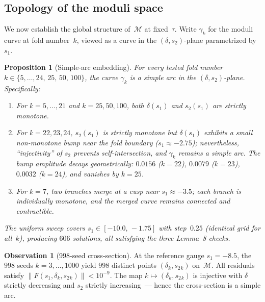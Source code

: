 \documentclass[11pt,a4paper]{article}
\theoremstyle{plain}
\newtheorem{proposition}[theorem]{Proposition}
\theoremstyle{definition}
\newtheorem{observation}[theorem]{Observation}
\theoremstyle{remark}
\newcommand{\norm}[1]{\lVert #1 \rVert}
\begin{document}
\subsection{Topology of the moduli space}%
\label{sec:moduli-topology}

We now establish the global structure of~$\mathcal{M}$ at fixed~$\tau$.
Write $\gamma_k$ for the moduli curve at fold number~$k$, viewed as
a curve in the $(\delta,s_2)$-plane parametrized by~$s_1$.

\begin{proposition}[Simple-arc embedding]
\label{prop:simple-arc}
For every tested fold number $k \in \{5,\ldots,24,\, 25,\, 50,\, 100\}$,
the curve $\gamma_k$ is a simple arc in the
$(\delta,s_2)$-plane.  Specifically:
\begin{enumerate}[label=\upshape(\roman*)]
\item For $k = 5,\ldots,21$ and $k = 25,50,100$, both
  $\delta(s_1)$ and $s_2(s_1)$ are strictly monotone.
\item For $k = 22,23,24$, $s_2(s_1)$ is strictly monotone
  but $\delta(s_1)$ exhibits a small non-monotone bump
  near the fold boundary ($s_1 \approx -2.75$);
  nevertheless, ``injectivity'' of $s_2$ prevents
  self-intersection, and $\gamma_k$ remains a simple arc.
  The bump amplitude decays geometrically:
  $0.0156$ ($k=22$), $0.0079$ ($k=23$),
  $0.0032$ ($k=24$), and vanishes by $k = 25$.
\item For $k = 7$, two branches merge at a cusp near
  $s_1 \approx -3.5$; each branch is individually
  monotone, and the merged curve remains connected and
  contractible.
\end{enumerate}
The uniform sweep covers $s_1 \in [-10.0,\, -1.75]$ with
step~$0.25$ (identical grid for all~$k$), producing
$606$ solutions, \emph{all} satisfying the three Lemma~8
checks.
\end{proposition}

\begin{observation}[998-seed cross-section]
\label{obs:cross-section}
At the reference gauge $s_1 = -8.5$, the $998$ seeds
$k = 3,\ldots,1000$ yield $998$ distinct points
$(\delta_k, s_2{}_k)$ on~$\mathcal{M}$.  All residuals
satisfy $\norm{F(s_1, \delta_k, s_2{}_k)} < 10^{-9}$.
The map $k \mapsto (\delta_k, s_2{}_k)$ is injective with
$\delta$ strictly decreasing and $s_2$ strictly increasing~---
hence the cross-section is a simple arc.
\end{observation}
\end{document}
